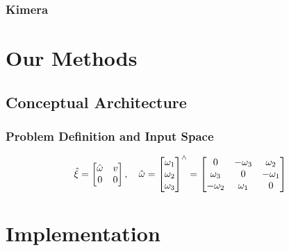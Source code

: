\subsubsection{Kimera}

\section{Our Methods}

\subsection{Conceptual Architecture}
\subsubsection{Problem Definition and Input Space}


\begin{equation}
  \hat{\xi} = \left[  \begin{matrix} \hat\omega & v \\ 0 & 0 \end{matrix}  \right], \quad 
    \hat\omega = \left[  \begin{matrix} \omega_1 \\ \omega_2 \\ \omega_3  \end{matrix}  \right]^{\wedge} = \left[  \begin{matrix} 0 & -\omega_3 & \omega_2 \\ \omega_3 & 0 & -\omega_1 \\ -\omega_2 & \omega_1 & 0 \end{matrix}  \right]
\end{equation}

\section{Implementation}
